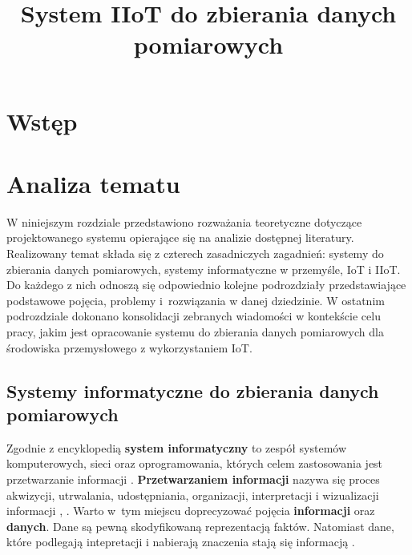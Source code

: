 \documentclass[a4paper, 12pt, twoside]{article}
\title{System IIoT do zbierania danych pomiarowych}
\date{}
\begin{document}
\clearpage\maketitle %
\thispagestyle{empty}

\listoftodos

\newpage

\section{Wstęp}

\section{Analiza tematu}

W niniejszym rozdziale przedstawiono rozważania teoretyczne dotyczące projektowanego
systemu opierające się na analizie dostępnej literatury. Realizowany temat
składa się z czterech zasadniczych zagadnień: systemy do zbierania danych pomiarowych,
systemy informatyczne w przemyśle, IoT i IIoT.  Do każdego z nich odnoszą się
odpowiednio kolejne podrozdziały przedstawiające podstawowe pojęcia, problemy i~rozwiązania 
w danej dziedzinie.
W ostatnim podrozdziale dokonano konsolidacji zebranych wiadomości w kontekście
celu pracy, jakim jest opracowanie systemu do zbierania danych pomiarowych 
dla środowiska przemysłowego z wykorzystaniem IoT.

\subsection{Systemy informatyczne do zbierania danych pomiarowych} \label{system-do-zbierania-danych}

Zgodnie z encyklopedią \textbf{system informatyczny} to zespół systemów komputerowych,
sieci oraz oprogramowania, których celem zastosowania jest 
przetwarzanie informacji \cite{system-informatyczny}. 
\textbf{Przetwarzaniem informacji} nazywa się proces akwizycji, utrwalania, udostępniania,
organizacji, interpretacji i wizualizacji informacji \cite{information-science}, 
\cite{information-processing}. Warto w~tym miejscu doprecyzować pojęcia
\textbf{informacji} oraz \textbf{danych}. Dane są pewną skodyfikowaną reprezentacją
faktów. Natomiast dane, które podlegają intepretacji i nabierają znaczenia 
stają się informacją \cite{dane-informacja-wiedza}.
\end{document}
